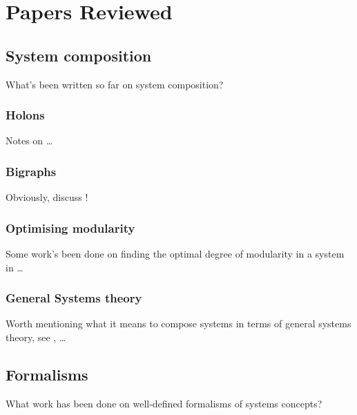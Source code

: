 \section{Papers Reviewed}  %

\subsection{System composition}

What's been written so far on system composition?

\subsubsection{Holons}\label{review:blair2015holons}

Notes on \cite{blair2015holons}\ldots

\subsubsection{Bigraphs}\label{review:milner2009space}

Obviously, discuss \cite{milner2009space}!

\subsubsection{Optimising modularity}

Some work's been done on finding the optimal degree of modularity in a system in \cite{frenken2012optimal}\ldots

\subsubsection{General Systems theory}

Worth mentioning what it means to compose systems in terms of general systems
theory, see \cite{boulding1956general}, \cite{polanyi1968life}\ldots



\subsection{Formalisms}

What work has been done on well-defined formalisms of systems concepts?

